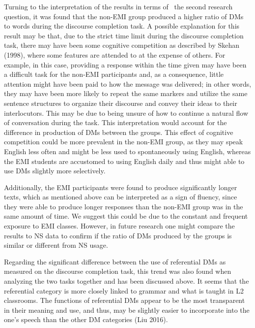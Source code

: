 \documentclass[12pt]{article}
\newenvironment{styleStandard}{\setlength\leftskip{0cm}\setlength\rightskip{0cm plus 1fil}\setlength\parindent{0cm}\setlength\parfillskip{0pt plus 1fil}\setlength\parskip{0in plus 1pt}\writerlistparindent\writerlistleftskip\leavevmode\normalfont\normalsize\writerlistlabel\ignorespaces}{\unskip\vspace{0.111in plus 0.0111in}\par}
\newcommand\writerlistleftskip{}
\newcommand\writerlistparindent{}
\newcommand\writerlistlabel{}
\begin{document}
\begin{styleStandard}
Turning to the interpretation of the results in terms of \ the second research question, it was found that the non-EMI group produced a higher ratio of DMs to words during the discourse completion task. A possible explanation for this result may be that, due to the strict time limit during the discourse completion task, there may have been some cognitive competition as described by Skehan (1998), where some features are attended to at the expense of others. For example, in this case, providing a response within the time given may have been a difficult task for the non-EMI participants and, as a consequence, little attention might have been paid to how the message was delivered; in other words, they may have been more likely to repeat the same markers and utilize the same sentence structures to organize their discourse and convey their ideas to their interlocutors. This may be due to being unsure of how to continue a natural flow of conversation during the task. This interpretation would account for the difference in production of DMs between the groups. This effect of cognitive competition could be more prevalent in the non-EMI group, as they may speak English less often and might be less used to spontaneously using English, whereas the EMI students are accustomed to using English daily and thus might able to use DMs slightly more selectively.
\end{styleStandard}

\begin{styleStandard}
Additionally, the EMI participants were found to produce significantly longer texts, which as mentioned above can be interpreted as a sign of fluency, since they were able to produce longer responses than the non-EMI group was in the same amount of time. We suggest this could be due to the constant and frequent exposure to EMI classes. However, in future research one might compare the results to NS data to confirm if the ratio of DMs produced by the groups is similar or different from NS usage. 
\end{styleStandard}

\begin{styleStandard}
Regarding the significant difference between the use of referential DMs as measured on the discourse completion task, this trend was also found when analyzing the two tasks together and has been discussed above. It seems that the referential category is more closely linked to grammar and what is taught in L2 classrooms. The functions of referential DMs appear to be the most transparent in their meaning and use, and thus, may be slightly easier to incorporate into the one’s speech than the other DM categories (Liu 2016).
\end{styleStandard}
\end{document}
